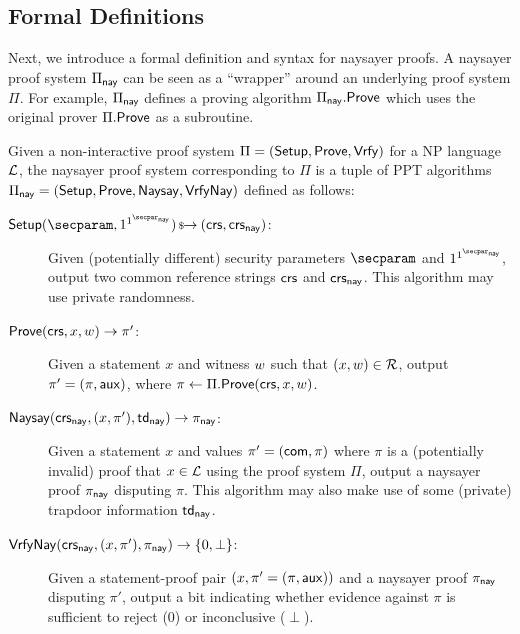 \subsection{Formal Definitions}\label{sec:naysayer_def}

Next, we introduce a formal definition and syntax for naysayer proofs. A naysayer proof system $\Pi_{\mathsf{nay}}$ can be seen as a ``wrapper'' around an underlying proof system $\Pi$. For example, $\Pi_{\sf nay}$ defines a proving algorithm $\Pi_{\mathsf{nay}}.\mathsf{Prove}$ which uses the original prover $\Pi.\mathsf{Prove}$ as a subroutine.

\begin{definition}\label{def:naysayer_proof}
Given a non-interactive proof system $\Pi = (\mathsf{Setup}, \mathsf{Prove}, \mathsf{Vrfy})$ for a NP language $\mathcal{L}$, the naysayer proof system corresponding to $\Pi$ is a tuple of PPT algorithms $\Pi_{\mathsf{nay}} = (\mathsf{Setup}, \mathsf{Prove},\allowbreak \mathsf{Naysay}, {\mathsf{Vrfy}}\mathsf{Nay})$ defined as follows:
    \begin{description}
        \item[$\setup(\secparam, 1^{\naysecparam}) \randout (\crs,\crs_{\nay})$:] Given (potentially different) security parameters $\secparam$ and $1^{\naysecparam}$, output two common reference strings $\mathsf{crs}$ and $\mathsf{crs}_{\mathsf{nay}}$. This algorithm may use private randomness.
        \item[$\mathsf{Prove}(\mathsf{crs}, x, w) \to \pi'$:] Given a statement $x$ and witness $w$ such that $(x,\allowbreak w) \in \mathcal{R}$, 
        output $\pi' = (\pi, \mathsf{aux})$, where $\pi \gets \Pi.\mathsf{Prove}(\mathsf{crs}, x, w)$.
        \item[$\mathsf{Naysay}(\mathsf{crs}_{\mathsf{nay}}, (x,\pi'), \mathsf{td}_{\mathsf{nay}}) \rightarrow \pi_{\mathsf{nay}}$:] Given a statement $x$ and values $\pi' = (\mathsf{com},\allowbreak \pi)$ where $\pi$ is a (potentially invalid) proof that $x \in \mathcal{L}$ using the proof system $\Pi$, output a naysayer proof $\pi_{\mathsf{nay}}$ disputing $\pi$. This algorithm may also make use of some (private) trapdoor information $\mathsf{td}_{\mathsf{nay}}$.
        \item[${\mathsf{Vrfy}}\mathsf{Nay}(\mathsf{crs}_{\mathsf{nay}}, (x,\pi'), \pi_{\mathsf{nay}}) \rightarrow \{0, \perp\}$:] Given a statement-proof pair $(x,\allowbreak \pi'=(\pi,\mathsf{aux}))$ and a naysayer proof $\pi_{\mathsf{nay}}$ disputing $\pi'$, output a bit indicating whether evidence against $\pi$ is sufficient to reject (0) or inconclusive ($\perp$).
    \end{description}
\end{definition}

